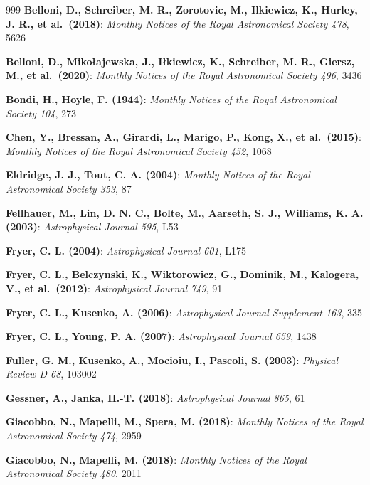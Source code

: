 \begin{thebibliography}{999}
\textbf{Belloni, D., Schreiber, M. R., Zorotovic, M., Ilkiewicz, K., Hurley, J. R., et al.\ (2018)}:     \textit{Monthly Notices of the Royal Astronomical Society 478}, 5626

\textbf{Belloni, D., Mikołajewska, J., Iłkiewicz, K., Schreiber, M. R., Giersz, M., et al.\ (2020)}:     \textit{Monthly Notices of the Royal Astronomical Society 496}, 3436

\textbf{Bondi, H., Hoyle, F. (1944)}:     \textit{Monthly Notices of the Royal Astronomical Society 104}, 273

\textbf{Chen, Y., Bressan, A., Girardi, L., Marigo, P., Kong, X., et al.\ (2015)}:     \textit{Monthly Notices of the Royal Astronomical Society 452}, 1068

\textbf{Eldridge, J. J., Tout, C. A. (2004)}:     \textit{Monthly Notices of the Royal Astronomical Society 353}, 87

\textbf{Fellhauer, M., Lin, D. N. C., Bolte, M., Aarseth, S. J., Williams, K. A. (2003)}:     \textit{Astrophysical Journal 595}, L53

\textbf{Fryer, C. L. (2004)}:     \textit{Astrophysical Journal 601}, L175

\textbf{Fryer, C. L., Belczynski, K., Wiktorowicz, G., Dominik, M., Kalogera, V., et al.\ (2012)}:     \textit{Astrophysical Journal 749}, 91

\textbf{Fryer, C. L., Kusenko, A. (2006)}:     \textit{Astrophysical Journal Supplement 163}, 335

\textbf{Fryer, C. L., Young, P. A. (2007)}:     \textit{Astrophysical Journal 659}, 1438

\textbf{Fuller, G. M., Kusenko, A., Mocioiu, I., Pascoli, S. (2003)}:     \textit{Physical Review D 68}, 103002

\textbf{Gessner, A., Janka, H.-T. (2018)}:     \textit{Astrophysical Journal 865}, 61

\textbf{Giacobbo, N., Mapelli, M., Spera, M. (2018)}:     \textit{Monthly Notices of the Royal Astronomical Society 474}, 2959

\textbf{Giacobbo, N., Mapelli, M. (2018)}:     \textit{Monthly Notices of the Royal Astronomical Society 480}, 2011


\end{thebibliography}
